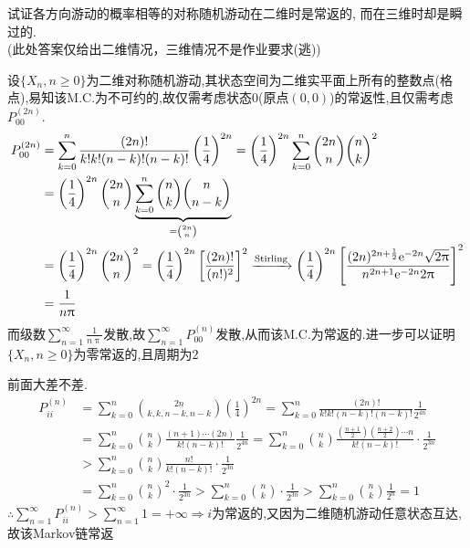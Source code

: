 \begin{problem}{3.13}
试证各方向游动的概率相等的对称随机游动在二维时是常返的, 而在三维时却是瞬过的.
\\ (此处答案仅给出二维情况，三维情况不是作业要求(逃))
\end{problem}
\begin{solution}[1(jkadbear及郑老师解法)]
	设$\{X_n,n\geqslant 0\}$为二维对称随机游动,其状态空间为二维实平面上所有的整数点(格点),易知该M.C.为不可约的,故仅需考虑状态0(原点$(0,0)$)的常返性,且仅需考虑$P_{00}^{(2n)}$.
	\[\begin{split}
			P_{00}^{(2n)} & = \sum_{k=0}^{n}\frac{(2n)!}{k!k!(n-k)!(n-k)!}\left(\frac{1}{4}\right)^{2n} = \left(\frac{1}{4}\right)^{2n}\sum_{k=0}^{n}\binom{2n}{n}\binom{n}{k}^{2} \\
			& = \left(\frac{1}{4}\right)^{2n}\binom{2n}{n}\underbrace{\sum_{k=0}^{n}\binom{n}{k}\binom{n}{n-k}}_{=\binom{2n}{n}}\\
			& = \left(\frac{1}{4}\right)^{2n}\binom{2n}{n}^{2} = \left(\frac{1}{4}\right)^{2n}\left[\frac{(2n)!}{(n!)^2}\right]^2 \xrightarrow{\text{Stirling}}\left(\frac{1}{4}\right)^{2n}\left[\frac{(2n)^{2n+\frac{1}{2}}\mathrm{e}^{-2n}\sqrt{2\uppi}}{n^{2n+1}\mathrm{e}^{-2n}2\uppi}\right]^2\\
			& = \frac{1}{n\uppi}
		\end{split}\]
	而级数$\sum_{n=1}^{\infty}\frac{1}{n\uppi}$发散,故$\sum_{n=1}^{\infty}P_{00}^{(n)}$发散,从而该M.C.为常返的.进一步可以证明$\{X_n,n\geqslant 0\}$为零常返的,且周期为2
\end{solution}
\begin{solution}[2]
	前面大差不差.
	\[\begin{split}
			P_{ii}^{(n)} & = \sum_{k=0}^{n}\binom{2n}{k,k,n-k,n-k}\left(\frac{1}{4}\right)^{2n} = \sum_{k=0}^{n}\frac{(2n)!}{k!k!(n-k)!(n-k)!}\frac{1}{2^{4n}} \\
			& = \sum_{k=0}^{n}\binom{n}{k}\frac{(n+1)\cdots (2n)}{k!(n-k)!}\frac{1}{2^{4n}} = \sum_{k=0}^{n}\binom{n}{k}\frac{(\frac{n+1}{2})(\frac{n+2}{2})\cdots n}{k!(n-k)!}\cdot \frac{1}{2^{3n}}\\
			& > \sum_{k=0}^{n}\binom{n}{k}\frac{n!}{k!(n-k)!}\cdot \frac{1}{2^{3n}}\\
			& =\sum_{k=0}^{n}\binom{n}{k}^{2}\cdot \frac{1}{2^{3n}} > \sum_{k=0}^{n}\binom{n}{k}\cdot \frac{1}{2^{3n}} >\sum_{k=0}^{n}\binom{n}{k}\frac{1}{2^n} = 1
		\end{split}\]
	$\therefore \sum_{n=1}^{\infty}P_{ii}^{(n)}>\sum_{n=1}^{\infty}1 = +\infty \Rightarrow i$为常返的,又因为二维随机游动任意状态互达,故该Markov链常返
\end{solution}

